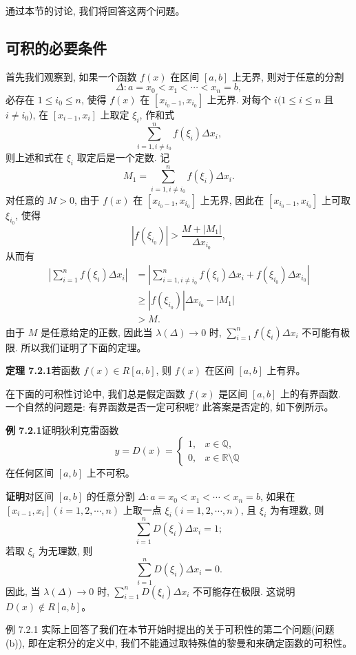 \documentclass[UTF8,12pt,a4paper,fontset=fandol]{ctexart}
\begin{document}
通过本节的讨论, 我们将回答这两个问题。

\subsection{可积的必要条件}

首先我们观察到, 如果一个函数 $f(x)$ 在区间 $[a,b]$ 上无界, 则对于任意的分割
\[
  \Delta:a=x_0<x_1<\cdots<x_n=b,
\]
必存在 $1\leq i_0\leq n$, 使得 $f(x)$ 在 $[x_{i_0-1},x_{i_0}]$ 上无界. 对每个 $i(1\leq i\leq n$ 且 $i\ne i_0)$, 在 $[x_{i-1},x_i]$ 上取定 $\xi_i$, 作和式
\[
  \sum_{i=1,i\ne i_0}^n f(\xi_i)\Delta x_i,
\]
则上述和式在 $\xi_i$ 取定后是一个定数. 记
\[
  M_1=\sum_{i=1,i\ne i_0}^n f(\xi_i)\Delta x_i.
\]
对任意的 $M>0$, 由于 $f(x)$ 在 $[x_{i_0-1},x_{i_0}]$ 上无界, 因此在 $[x_{i_0-1},x_{i_0}]$ 上可取 $\xi_{i_0}$, 使得
\[
  |f(\xi_{i_0})|>\frac{M+|M_1|}{\Delta x_{i_0}},
\]
从而有
\[
\begin{aligned}
  \left|\sum_{i=1}^n f(\xi_i)\Delta x_i\right|
  &=\left|\sum_{i=1,i\ne i_0}^n f(\xi_i)\Delta x_i+f(\xi_{i_0})\Delta x_{i_0}\right|\\
  &\geq |f(\xi_{i_0})|\Delta x_{i_0}-|M_1|\\
  &>M.
\end{aligned}
\]
由于 $M$ 是任意给定的正数, 因此当 $\lambda(\Delta)\to0$ 时, $\sum\limits_{i=1}^n f(\xi_i)\Delta x_i$ 不可能有极限. 所以我们证明了下面的定理。

\noindent\textbf{定理 7.2.1}\quad 若函数 $f(x)\in R[a,b]$, 则 $f(x)$ 在区间 $[a,b]$ 上有界。

在下面的可积性讨论中, 我们总是假定函数 $f(x)$ 是区间 $[a,b]$ 上的有界函数. 一个自然的问题是: 有界函数是否一定可积呢? 此答案是否定的, 如下例所示。

\noindent\textbf{例 7.2.1}\quad 证明狄利克雷函数
\[
  y=D(x)=
  \begin{cases}
    1, & x\in\mathbb Q,\\
    0, & x\in\mathbb R\setminus\mathbb Q
  \end{cases}
\]
在任何区间 $[a,b]$ 上不可积。

\noindent\textbf{证明}\quad 对区间 $[a,b]$ 的任意分割 $\Delta:a=x_0<x_1<\cdots<x_n=b$, 如果在 $[x_{i-1},x_i](i=1,2,\cdots,n)$ 上取一点 $\xi_i(i=1,2,\cdots,n)$, 且 $\xi_i$ 为有理数, 则
\[
  \sum_{i=1}^n D(\xi_i)\Delta x_i=1;
\]
若取 $\xi_i$ 为无理数, 则
\[
  \sum_{i=1}^n D(\xi_i)\Delta x_i=0.
\]
因此, 当 $\lambda(\Delta)\to0$ 时, $\sum\limits_{i=1}^n D(\xi_i)\Delta x_i$ 不可能存在极限. 这说明 $D(x)\notin R[a,b]$。

例 7.2.1 实际上回答了我们在本节开始时提出的关于可积性的第二个问题(问题 (b)), 即在定积分的定义中, 我们不能通过取特殊值的黎曼和来确定函数的可积性。
\end{document}
